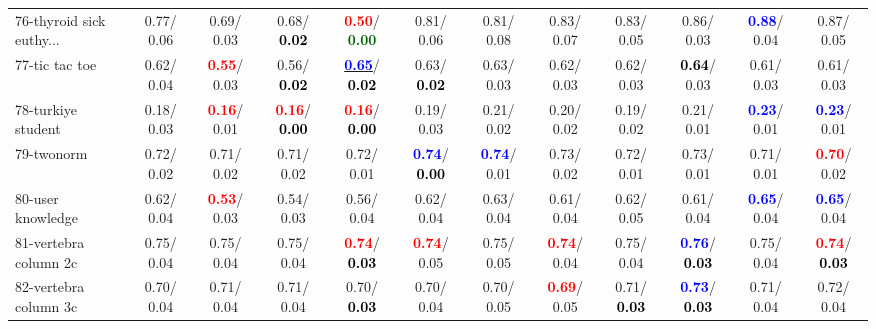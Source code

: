 \begin{table}[h]
\begin{center}
{\begin{tabular}{lc|c|c|c|c|c|c|c|c|c|c}
76-thyroid sick euthy... &   0.77/  0.06 &   0.69/  0.03 &   0.68/\textcolor{black}{\textbf{  0.02}} & \textcolor{red}{\textbf{  0.50}}/\textcolor{darkgreen}{\textbf{  0.00}} &   0.81/  0.06 &   0.81/  0.08 &   0.83/  0.07 &   0.83/  0.05 &   0.86/  0.03 & \textcolor{blue}{\textbf{  0.88}}/  0.04 &   0.87/  0.05 \\
77-tic tac toe &   0.62/  0.04 & \textcolor{red}{\textbf{  0.55}}/  0.03 &   0.56/\textcolor{black}{\textbf{  0.02}} & \underline{\textcolor{blue}{\textbf{  0.65}}}/\textcolor{black}{\textbf{  0.02}} &   0.63/\textcolor{black}{\textbf{  0.02}} &   0.63/  0.03 &   0.62/  0.03 &   0.62/  0.03 & \textcolor{black}{\textbf{  0.64}}/  0.03 &   0.61/  0.03 &   0.61/  0.03 \\
78-turkiye student &   0.18/  0.03 & \textcolor{red}{\textbf{  0.16}}/  0.01 & \textcolor{red}{\textbf{  0.16}}/\textcolor{black}{\textbf{  0.00}} & \textcolor{red}{\textbf{  0.16}}/\textcolor{black}{\textbf{  0.00}} &   0.19/  0.03 &   0.21/  0.02 &   0.20/  0.02 &   0.19/  0.02 &   0.21/  0.01 & \textcolor{blue}{\textbf{  0.23}}/  0.01 & \textcolor{blue}{\textbf{  0.23}}/  0.01 \\ \hline
79-twonorm &   0.72/  0.02 &   0.71/  0.02 &   0.71/  0.02 &   0.72/  0.01 & \textcolor{blue}{\textbf{  0.74}}/\textcolor{black}{\textbf{  0.00}} & \textcolor{blue}{\textbf{  0.74}}/  0.01 &   0.73/  0.02 &   0.72/  0.01 &   0.73/  0.01 &   0.71/  0.01 & \textcolor{red}{\textbf{  0.70}}/  0.02 \\
80-user knowledge &   0.62/  0.04 & \textcolor{red}{\textbf{  0.53}}/  0.03 &   0.54/  0.03 &   0.56/  0.04 &   0.62/  0.04 &   0.63/  0.04 &   0.61/  0.04 &   0.62/  0.05 &   0.61/  0.04 & \textcolor{blue}{\textbf{  0.65}}/  0.04 & \textcolor{blue}{\textbf{  0.65}}/  0.04 \\
81-vertebra column 2c &   0.75/  0.04 &   0.75/  0.04 &   0.75/  0.04 & \textcolor{red}{\textbf{  0.74}}/\textcolor{black}{\textbf{  0.03}} & \textcolor{red}{\textbf{  0.74}}/  0.05 &   0.75/  0.05 & \textcolor{red}{\textbf{  0.74}}/  0.04 &   0.75/  0.04 & \textcolor{blue}{\textbf{  0.76}}/\textcolor{black}{\textbf{  0.03}} &   0.75/  0.04 & \textcolor{red}{\textbf{  0.74}}/\textcolor{black}{\textbf{  0.03}} \\
82-vertebra column 3c &   0.70/  0.04 &   0.71/  0.04 &   0.71/  0.04 &   0.70/\textcolor{black}{\textbf{  0.03}} &   0.70/  0.04 &   0.70/  0.05 & \textcolor{red}{\textbf{  0.69}}/  0.05 &   0.71/\textcolor{black}{\textbf{  0.03}} & \textcolor{blue}{\textbf{  0.73}}/\textcolor{black}{\textbf{  0.03}} &   0.71/  0.04 &   0.72/  0.04 \\

\end{tabular}}
\end{center}
\end{table}
